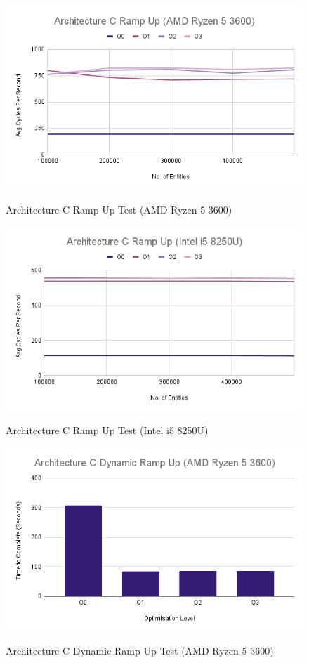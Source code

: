 \documentclass{article}
\begin{document}
\begin{figure}[!h]
\centering
\includegraphics[scale=0.5]{Architecture C Ramp Up (AMD Ryzen 5 3600).png}
\label{arch_c_ramp_up_pc}
\caption{Architecture C Ramp Up Test (AMD Ryzen 5 3600)}
\end{figure}

\begin{figure}[!h]
\centering
\includegraphics[scale=0.5]{Architecture C Ramp Up (Intel i5 8250U).png}
\label{arch_c_ramp_up_laptop}
\caption{Architecture C Ramp Up Test (Intel i5 8250U)}
\end{figure}

\begin{figure}[!h]
\centering
\includegraphics[scale=0.5]{Architecture C Dynamic Ramp Up (AMD Ryzen 5 3600).png}
\label{arch_c_dynamic_ramp_up_pc}
\caption{Architecture C Dynamic Ramp Up Test (AMD Ryzen 5 3600)}
\end{figure}
\end{document}
